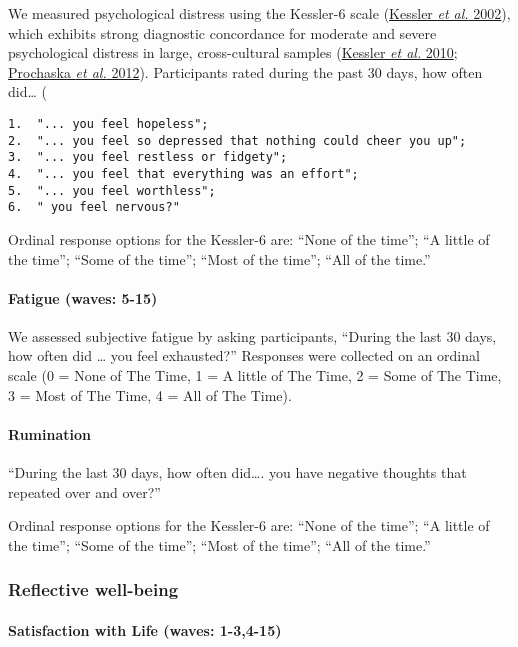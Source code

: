 \documentclass[
  singlecolumn,
  9pt]{article}
\let\oldparagraph\paragraph
\renewcommand{\paragraph}[1]{\oldparagraph{#1}\mbox{}}
\begin{document}
We measured psychological distress using the Kessler-6 scale
(\hyperref[ref-kessler2002]{Kessler \emph{et al.} 2002}), which exhibits
strong diagnostic concordance for moderate and severe psychological
distress in large, cross-cultural samples
(\hyperref[ref-kessler2010]{Kessler \emph{et al.} 2010};
\hyperref[ref-prochaska2012]{Prochaska \emph{et al.} 2012}).
Participants rated during the past 30 days, how often did\ldots{} (

\begin{verbatim}
1.  "... you feel hopeless";
2.  "... you feel so depressed that nothing could cheer you up";
3.  "... you feel restless or fidgety";
4.  "... you feel that everything was an effort";
5.  "... you feel worthless";
6.  " you feel nervous?"
\end{verbatim}

Ordinal response options for the Kessler-6 are: ``None of the time'';
``A little of the time''; ``Some of the time''; ``Most of the time'';
``All of the time.''

\paragraph{Fatigue (waves: 5-15)}\label{fatigue-waves-5-15}

We assessed subjective fatigue by asking participants, ``During the last
30 days, how often did \ldots{} you feel exhausted?'' Responses were
collected on an ordinal scale (0 = None of The Time, 1 = A little of The
Time, 2 = Some of The Time, 3 = Most of The Time, 4 = All of The Time).

\paragraph{Rumination}\label{rumination}

``During the last 30 days, how often did\ldots. you have negative
thoughts that repeated over and over?''

Ordinal response options for the Kessler-6 are: ``None of the time'';
``A little of the time''; ``Some of the time''; ``Most of the time'';
``All of the time.''

\subsubsection{Reflective well-being}\label{reflective-well-being}

\paragraph{Satisfaction with Life (waves:
1-3,4-15)}\label{satisfaction-with-life-waves-1-34-15}
\end{document}
